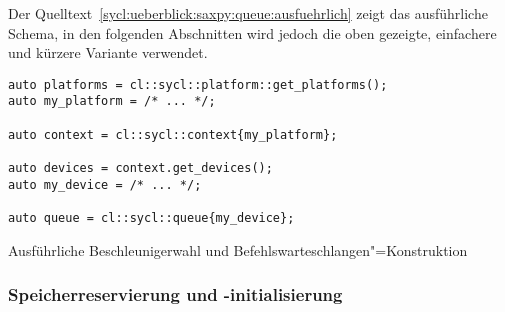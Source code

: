 Der Quelltext~\ref{sycl:ueberblick:saxpy:queue:ausfuehrlich} zeigt das
ausführliche Schema, in den folgenden Abschnitten wird jedoch die oben gezeigte,
einfachere und kürzere Variante verwendet.

\begin{code}
    \begin{verbatim}
auto platforms = cl::sycl::platform::get_platforms();
auto my_platform = /* ... */;

auto context = cl::sycl::context{my_platform};

auto devices = context.get_devices();
auto my_device = /* ... */;

auto queue = cl::sycl::queue{my_device};
    \end{verbatim}
    \caption{Ausführliche Beschleunigerwahl und Befehlswarteschlangen"=Konstruktion}
    \label{sycl:ueberblick:saxpy:queue:ausfuehrlich}
\end{code}

\subsubsection{Speicherreservierung und -initialisierung}
\label{sycl:ueberblick:saxpy:buffer}

